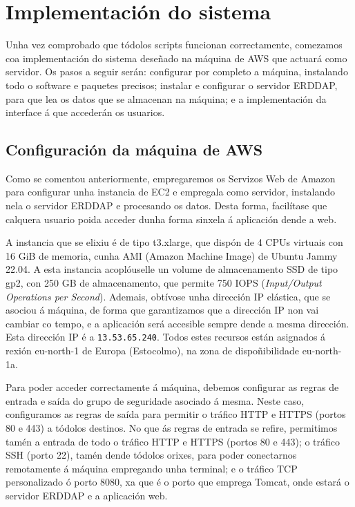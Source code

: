 \section{Implementación do sistema}\label{implementacion}
Unha vez comprobado que tódolos scripts funcionan correctamente, comezamos coa implementación do sistema deseñado na máquina de AWS que actuará como servidor. Os pasos a seguir serán: configurar por
completo a máquina, instalando todo o software e paquetes precisos; instalar e configurar o servidor ERDDAP, para que lea os datos que se almacenan na máquina; e a implementación da interface á que
accederán os usuarios.

\subsection{Configuración da máquina de AWS}\label{aws}
Como se comentou anteriormente, empregaremos os Servizos Web de Amazon para configurar unha instancia de EC2 e empregala como servidor, instalando nela o servidor ERDDAP e procesando os datos.
Desta forma, facilítase que calquera usuario poida acceder dunha forma sinxela á aplicación dende a web.

A instancia que se elixiu é de tipo t3.xlarge, que dispón de 4 CPUs virtuais con 16 GiB de memoria, cunha AMI (Amazon Machine Image) de Ubuntu Jammy 22.04. A esta instancia acoplóuselle un volume de
almacenamento SSD de tipo gp2, con 250 GB de almacenamento, que permite 750 IOPS (\textit{Input/Output Operations per Second}). Ademais, obtívose unha dirección IP elástica, que se asociou á
máquina, de forma que garantizamos que a dirección IP non vai cambiar co tempo, e a aplicación será accesible sempre dende a mesma dirección. Esta dirección IP é a \texttt{13.53.65.240}. Todos estes recursos están
asignados á rexión eu-north-1 de Europa (Estocolmo), na zona de dispoñibilidade eu-north-1a.

Para poder acceder correctamente á máquina, debemos configurar as regras de entrada e saída do grupo de seguridade asociado á mesma. Neste caso, configuramos as regras de saída para permitir o tráfico
HTTP e HTTPS (portos 80 e 443) a tódolos destinos. No que ás regras de entrada se refire, permitimos tamén a entrada de todo o tráfico HTTP e HTTPS (portos 80 e 443); o tráfico SSH (porto 22), tamén
dende tódolos orixes, para poder conectarnos remotamente á máquina empregando unha terminal; e o tráfico TCP personalizado ó porto 8080, xa que é o porto que emprega Tomcat, onde estará o servidor
ERDDAP e a aplicación web.

